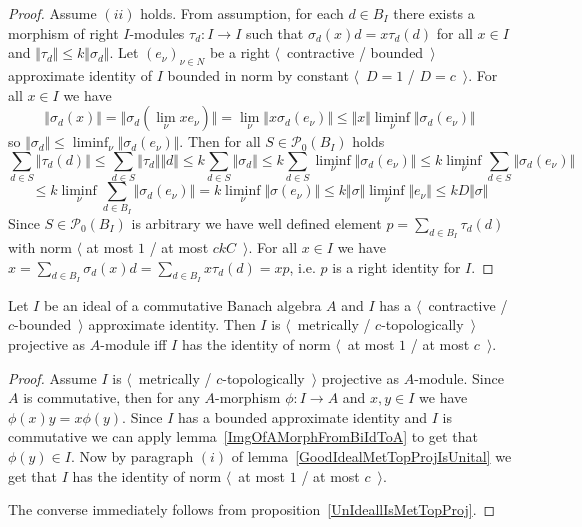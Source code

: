 \begin{proof}
Assume $(ii)$ holds. From assumption, for each $d\in B_I$ there exists a
morphism of right $I$-modules $\tau_d:I\to I$ such that
$\sigma_d(x)d=x\tau_d(d)$ for all $x\in I$ and 
$\Vert\tau_d\Vert\leq k\Vert\sigma_d\Vert$. 
Let ${(e_\nu)}_{\nu\in N}$ be a right $\langle$~contractive / bounded~$\rangle$ 
approximate identity of $I$ bounded in norm by constant 
$\langle$~$D=1$ / $D=c$~$\rangle$. For all $x\in I$ we have
$$
\Vert\sigma_d(x)\Vert
=\Vert\sigma_d(\lim_\nu x e_\nu)\Vert
=\lim_\nu\Vert x\sigma_d(e_\nu)\Vert
\leq\Vert x\Vert\liminf_\nu\Vert\sigma_d(e_\nu)\Vert
$$
so $\Vert\sigma_d\Vert\leq \liminf_\nu\Vert\sigma_d(e_\nu)\Vert$. 
Then for all $S\in\mathcal{P}_0(B_I)$ holds
$$
\sum_{d\in S}\Vert \tau_d(d)\Vert
\leq \sum_{d\in S}\Vert \tau_d\Vert\Vert d\Vert
\leq k\sum_{d\in S}\Vert \sigma_d\Vert
\leq k\sum_{d\in S}\liminf_\nu \Vert \sigma_d(e_\nu)\Vert
\leq k\liminf_{\nu}\sum_{d\in S}\Vert \sigma_d(e_\nu) \Vert
$$
$$
\leq k\liminf_{\nu}\sum_{d\in B_I}\Vert \sigma_d(e_\nu) \Vert
=k\liminf_{\nu}\Vert\sigma(e_\nu)\Vert
\leq k\Vert\sigma\Vert\liminf_{\nu}\Vert e_\nu\Vert
\leq kD\Vert\sigma\Vert
$$
Since $S\in \mathcal{P}_0(B_I)$ is arbitrary we have well defined element
$p=\sum_{d\in B_I}\tau_d(d)$ with norm $\langle$ at most $1$ / at most
$ckC$~$\rangle$. For all $x\in I$ 
we have $x=\sum_{d\in B_I}\sigma_d(x)d=\sum_{d\in B_I}x\tau_d(d)=xp$, 
i.e. $p$ is a right identity for $I$.
\end{proof}

\begin{theorem}\label{GoodCommIdealMetTopProjIsUnital} Let $I$ be an ideal of a
commutative Banach algebra $A$ and $I$ has a $\langle$~contractive /
$c$-bounded~$\rangle$ approximate identity. Then $I$ is $\langle$~metrically /
$c$-topologically~$\rangle$ projective as $A$-module iff $I$ has the identity of
norm $\langle$~at most $1$ / at most $c$~$\rangle$.
\end{theorem} 
\begin{proof} Assume $I$ is $\langle$~metrically / $c$-topologically~$\rangle$
projective as $A$-module. Since $A$ is commutative, then for any $A$-morphism
$\phi:I\to A$ and $x,y\in I$ we have $\phi(x)y=x\phi(y)$. Since $I$ has a 
bounded approximate identity and $I$ is commutative we can apply
lemma~\ref{ImgOfAMorphFromBiIdToA} to get that $\phi(y)\in I$. Now by paragraph
$(i)$ of lemma~\ref{GoodIdealMetTopProjIsUnital} we get that $I$ has the
identity of norm $\langle$~at most $1$ / at most $c$~$\rangle$.

The converse immediately follows from proposition~\ref{UnIdeallIsMetTopProj}.
\end{proof}

